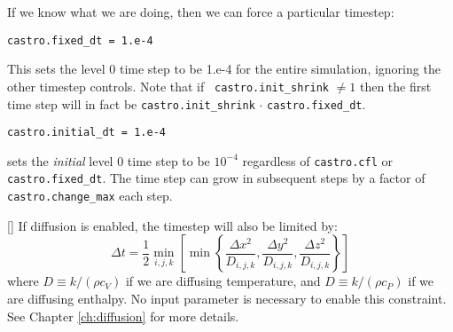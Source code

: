 If we know what we are doing, then we can force a particular timestep:
\begin{lstlisting}
castro.fixed_dt = 1.e-4
\end{lstlisting}
This sets the level 0 time step to be 1.e-4 for the entire simulation,
ignoring the other timestep controls.  Note that if {\tt
  castro.init\_shrink} $\neq 1$ then the first time step will in fact
be {\tt castro.init\_shrink} $\cdot$ {\tt castro.fixed\_dt}. \newline

\begin{lstlisting}
castro.initial_dt = 1.e-4
\end{lstlisting}
sets the {\it initial} level 0 time step to be $10^{-4}$ regardless of 
{\tt castro.cfl} or {\tt castro.fixed\_dt}.  The time step can
grow in subsequent steps by a factor of {\tt castro.change\_max} each step.



{[]} If diffusion is enabled, the timestep will also
be limited by:
\begin{equation}
\Delta t = \frac{1}{2}\min_{i,j,k}\left[\min\left\{\frac{\Delta x^2}{D_{i,j,k}},
                                                   \frac{\Delta y^2}{D_{i,j,k}},
                                                   \frac{\Delta z^2}{D_{i,j,k}}\right\}\right]
\end{equation}
where $D \equiv k / (\rho c_V)$ if we are diffusing temperature, and
$D \equiv k / (\rho c_P)$ if we are diffusing enthalpy. No input parameter
is necessary to enable this constraint. See Chapter \ref{ch:diffusion} for more details.

